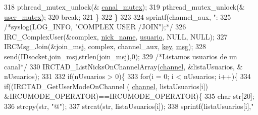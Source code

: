 \begin{DoxyCode}
{318                                                         pthread\_mutex\_unlock(&
      \hyperlink{_g-2361-06-_p1-_server_8c_ab86a544a49de18195048bac54dd3ac3e}{canal\_mutex});
319                                                         pthread\_mutex\_unlock(&
      \hyperlink{_g-2361-06-_p1-_server_8c_a5dedd07a1144d2ab70b74a8e64b6a7c0}{user\_mutex});
320                                                         \textcolor{keywordflow}{break};
321                                                 \}
322                                         \}
323 
324                                         sprintf(channel\_aux, \textcolor{stringliteral}{":%
325                                         \textcolor{comment}{/*syslog(LOG\_INFO, "COMPLEX USER /JOIN");*/}
326                                         IRC\_ComplexUser(&complex, \hyperlink{_g-2361-06-_p1-_server_8c_aabbf66718cda228b924a4a9441eadf62}{nick\_name}, 
      \hyperlink{_g-2361-06-_p1-_server_8c_a0147a5b81499984f9cb00379a8cb84af}{usuario}, NULL, NULL);
327                                         IRCMsg\_Join(&join\_msj, complex, channel\_aux, 
      \hyperlink{_g-2361-06-_p1-_server_8c_a5892a9181e6a332f84d27aecd41dcd12}{key}, \hyperlink{_g-2361-06-_p1-_server_8c_a32d2f5216cddb59c7cc8fb2806a7e727}{msg});
328                                         send(IDsocket,join\_msj,strlen(join\_msj),0);
329                                         \textcolor{comment}{/*Listamos usuarios de un canal*/}
330                                         IRCTAD\_ListNicksOnChannelArray(\hyperlink{_g-2361-06-_p1-_server_8c_a842ca2f026578e5c479c095ff3335969}{channel}, &listaUsuarios, &
      nUsuarios);
331 
332                                         \textcolor{keywordflow}{if}(nUsuarios > 0)\{
333                                                 \textcolor{keywordflow}{for}(i = 0; i < nUsuarios; i++)\{
334                                                         \textcolor{keywordflow}{if}((IRCTAD\_GetUserModeOnChannel (
      \hyperlink{_g-2361-06-_p1-_server_8c_a842ca2f026578e5c479c095ff3335969}{channel}, listaUsuarios[i]) &IRCUMODE\_OPERATOR)==IRCUMODE\_OPERATOR)\{
335                                                                 \textcolor{keywordtype}{char} str[20];
336                                                                 strcpy(str, \textcolor{stringliteral}{"@"});
337                                                                 strcat(str, listaUsuarios[i]);
338                                                                 sprintf(listaUsuarios[i],\textcolor{stringliteral}{"%
}}}
\end{DoxyCode}

